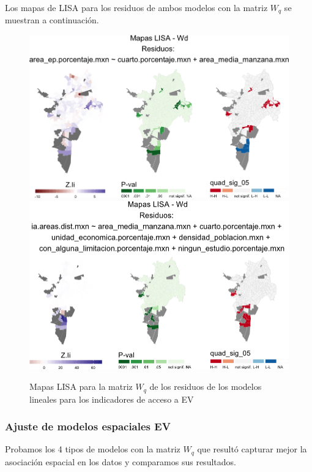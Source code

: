 \documentclass[12pt,]{book}
\begin{document}
Los mapas de LISA para los residuos de ambos modelos con la matriz
\(W_q\) se muestran a continuación.

\begin{figure}
\includegraphics[width=1\linewidth]{tesis-unigis_files/figure-latex/mapas-lisa-resev-wq-1} \includegraphics[width=1\linewidth]{tesis-unigis_files/figure-latex/mapas-lisa-resev-wq-2} \caption{Mapas LISA para la matriz $W_q$ de los residuos de los modelos lineales para los indicadores de acceso a EV}\label{fig:mapas-lisa-resev-wq}
\end{figure}

\subsubsection{Ajuste de modelos espaciales
EV}\label{ajuste-de-modelos-espaciales-ev}

Probamos los 4 tipos de modelos con la matriz \(W_q\) que resultó
capturar mejor la asociación espacial en los datos y comparamos sus
resultados.
\end{document}
